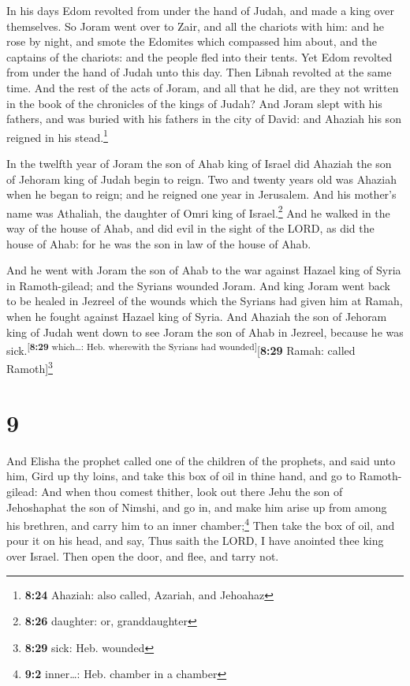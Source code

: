  In his days Edom revolted from under the hand of Judah,
and made a king over themselves.  So Joram went over to
Zair, and all the chariots with him: and he rose by night, and smote the
Edomites which compassed him about, and the captains of the chariots:
and the people fled into their tents.  Yet Edom revolted
from under the hand of Judah unto this day. Then Libnah revolted at the
same time.  And the rest of the acts of Joram, and all
that he did, are they not written in the book of the chronicles of the
kings of Judah?  And Joram slept with his fathers, and
was buried with his fathers in the city of David: and Ahaziah his son
reigned in his stead.\footnote{\textbf{8:24} Ahaziah: also called,
  Azariah, and Jehoahaz}

 In the twelfth year of Joram the son of Ahab king of
Israel did Ahaziah the son of Jehoram king of Judah begin to reign.
 Two and twenty years old was Ahaziah when he began to
reign; and he reigned one year in Jerusalem. And his mother's name was
Athaliah, the daughter of Omri king of Israel.\footnote{\textbf{8:26}
  daughter: or, granddaughter}  And he walked in the way
of the house of Ahab, and did evil in the sight of the LORD, as did the
house of Ahab: for he was the son in law of the house of Ahab.

 And he went with Joram the son of Ahab to the war
against Hazael king of Syria in Ramoth-gilead; and the Syrians wounded
Joram.  And king Joram went back to be healed in Jezreel
of the wounds which the Syrians had given him at Ramah, when he fought
against Hazael king of Syria. And Ahaziah the son of Jehoram king of
Judah went down to see Joram the son of Ahab in Jezreel, because he was
sick.\textsuperscript{{[}\textbf{8:29} which\ldots: Heb. wherewith the
Syrians had wounded{]}}{[}\textbf{8:29} Ramah: called
Ramoth{]}\footnote{\textbf{8:29} sick: Heb. wounded}

\hypertarget{section-8}{%
\section{9}\label{section-8}}

 And Elisha the prophet called one of the children of the
prophets, and said unto him, Gird up thy loins, and take this box of oil
in thine hand, and go to Ramoth-gilead:  And when thou
comest thither, look out there Jehu the son of Jehoshaphat the son of
Nimshi, and go in, and make him arise up from among his brethren, and
carry him to an inner chamber;\footnote{\textbf{9:2} inner\ldots: Heb.
  chamber in a chamber}  Then take the box of oil, and
pour it on his head, and say, Thus saith the LORD, I have anointed thee
king over Israel. Then open the door, and flee, and tarry not.

